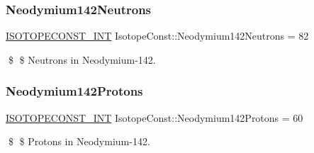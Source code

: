 \subsubsection{\texorpdfstring{Neodymium142\+Neutrons}{Neodymium142Neutrons}}
{\footnotesize\ttfamily \mbox{\hyperlink{group___isotope_const-_macros_ga5f18360b3e99483a35c32d789e62621c}{I\+S\+O\+T\+O\+P\+E\+C\+O\+N\+S\+T\+\_\+\+I\+NT}} Isotope\+Const\+::\+Neodymium142\+Neutrons = 82}

\$ \$ Neutrons in Neodymium-\/142. \mbox{\label{group___isotope_const-_neodymium-_nd142_gaee8b478665f4b3d8fd9a8f3631db0096}} 
\subsubsection{\texorpdfstring{Neodymium142\+Protons}{Neodymium142Protons}}
{\footnotesize\ttfamily \mbox{\hyperlink{group___isotope_const-_macros_ga5f18360b3e99483a35c32d789e62621c}{I\+S\+O\+T\+O\+P\+E\+C\+O\+N\+S\+T\+\_\+\+I\+NT}} Isotope\+Const\+::\+Neodymium142\+Protons = 60}

\$ \$ Protons in Neodymium-\/142. 
